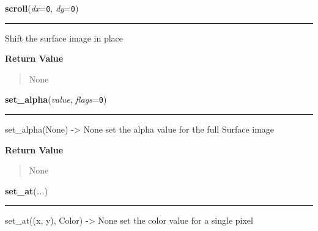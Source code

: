 \hspace{.8\funcindent}\begin{boxedminipage}{\funcwidth}

    \raggedright \textbf{scroll}(\textit{dx}={\tt 0}, \textit{dy}={\tt 0})

    \vspace{-1.5ex}

    \rule{\textwidth}{0.5\fboxrule}
\setlength{\parskip}{2ex}
    Shift the surface image in place

\setlength{\parskip}{1ex}
      \textbf{Return Value}
    \vspace{-1ex}

      \begin{quote}
      None

      \end{quote}

    \end{boxedminipage}

    \label{pygame:Surface:set_alpha}

    \vspace{0.5ex}

\hspace{.8\funcindent}\begin{boxedminipage}{\funcwidth}

    \raggedright \textbf{set\_alpha}(\textit{value}, \textit{flags}={\tt 0})

    \vspace{-1.5ex}

    \rule{\textwidth}{0.5\fboxrule}
\setlength{\parskip}{2ex}
    set\_alpha(None) -{\textgreater} None set the alpha value for the full 
    Surface image

\setlength{\parskip}{1ex}
      \textbf{Return Value}
    \vspace{-1ex}

      \begin{quote}
      None

      \end{quote}

    \end{boxedminipage}

    \label{pygame:Surface:set_at}

    \vspace{0.5ex}

\hspace{.8\funcindent}\begin{boxedminipage}{\funcwidth}

    \raggedright \textbf{set\_at}(\textit{...})

    \vspace{-1.5ex}

    \rule{\textwidth}{0.5\fboxrule}
\setlength{\parskip}{2ex}
    set\_at((x, y), Color) -{\textgreater} None set the color value for a 
    single pixel

\setlength{\parskip}{1ex}
    \end{boxedminipage}

